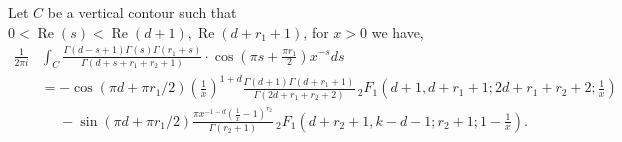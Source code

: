 \documentclass[]{article}
\renewcommand{\Re}{\operatorname{Re}}
\begin{document}
{\lem \label{lemma_gamma_function_stuflöskdflkdjlkfjlksdfjlsd} Let $C$ be  a vertical contour such that $0<\Re(s)<\Re(d+1),\Re(d+r_1+1)$, for $x > 0$ we have,
\begin{equation}\label{eq:weirc_cos_integral}
\begin{split}
 \frac{1}{2 \pi i}  &\int_{C}\frac{   \Gamma(d-s+1)   \Gamma(s) \Gamma(r_1 + s) }{\Gamma (d+s+r_1+r_2+1)  }        \cdot   \cos(\pi s + \frac{\pi r_1}{2})   x^{-s}  ds 
 \\
  & = - \cos(\pi d + \pi r_1 / 2)  \left(\frac{1}{x}\right)^{1+d} \frac{\Gamma (d+1) \Gamma (d+r_1+1)}{  \Gamma(2 d+r_1+r_2+2) }  \, _2 F_1\left(d+1,d+r_1+1;2 d+r_1+r_2+2;\frac{1}{x}\right)\\
 & \ \ \ \ \ \ - \sin(\pi d + \pi r_1 / 2)\frac{ \pi  x^{-1-d}  (\frac{1}{x}-1)^{r_2} }{\Gamma(r_2+1)} \, _2F_1\left(d+r_2+1, k-d-1;r_2+1;1-\frac{1}{x}\right).
  \end{split}
\end{equation} }
\end{document}
